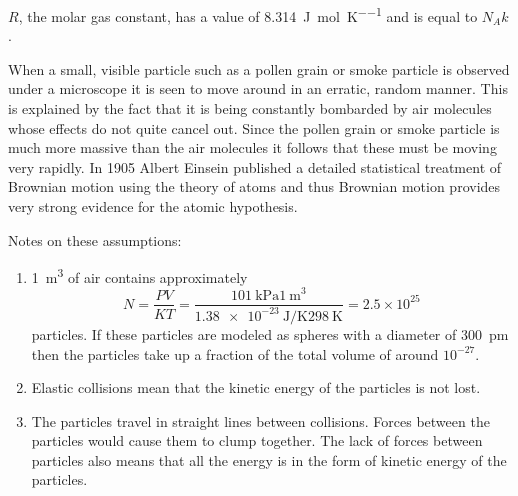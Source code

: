 \documentclass[main.tex]{subfiles}
\begin{document}
$R$, the molar gas constant, has a value of \SI{8.314}{\joule\per\mole\per\kelvin} and is equal to $N_A k$.


When a small, visible particle such as a pollen grain or smoke particle is observed under a microscope it is seen to move around in an erratic, random manner. This is explained by the fact that it is being constantly bombarded by air molecules whose effects do not quite cancel out. Since the pollen grain or smoke particle is much more massive than the air molecules it follows that these must be moving very rapidly. In 1905 Albert Einsein published a detailed statistical treatment of Brownian motion using the theory of atoms and thus Brownian motion provides very strong evidence for the atomic hypothesis.


Notes on these assumptions:
\begin{enumerate}
  \item \SI{1}{\metre^3} of air contains approximately $$N = \frac{PV}{KT} = \frac{\SI{101}{\kilo\pascal}\SI{1}{\metre^3}}{\SI{1.38e-23}{\joule\per\kelvin}\SI{298}{\kelvin}} = 2.5\times 10^{25}$$
  particles. If these particles are modeled as spheres with a diameter of \SI{300}{\pico\metre} then the particles take up a fraction of the total volume of around $10^{-27}$.
  \item Elastic collisions mean that the kinetic energy of the particles is not lost.
  \item The particles travel in straight lines between collisions. Forces between the particles would cause them to clump together. The lack of forces between particles also means that all the energy is in the form of kinetic energy of the particles.
\end{enumerate}

\end{document}
